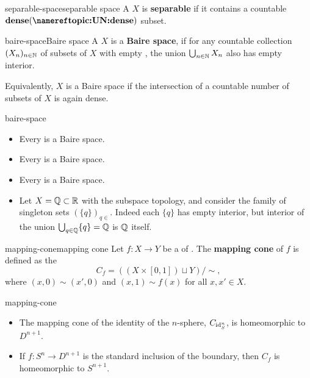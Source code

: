 \begin{topic}{separable-space}{separable space}
    A  $X$ is \textbf{separable} if it contains a countable $\tref{dense}{dense}$ subset.
\end{topic}

\begin{topic}{baire-space}{Baire space}
    A  $X$ is a \textbf{Baire space}, if for any countable collection $(X_n)_{n \in \mathbb{N}}$ of subsets of $X$ with empty , the union $\bigcup_{n \in \mathbb{N}} X_n$ also has empty interior.
    
    Equivalently, $X$ is a Baire space if the intersection of a countable number of  subsets of $X$ is again dense.
\end{topic}

\begin{example}{baire-space}
    \begin{itemize}
        \item Every   is a Baire space.
        \item Every  is a Baire space.
        \item Every  is a Baire space.
        \item Let $X = \mathbb{Q} \subset \mathbb{R}$ with the subspace topology, and consider the family of singleton sets $(\{ q \})_{q \in }$. Indeed each $\{ q \}$ has empty interior, but interior of the union $\bigcup_{q \in \mathbb{Q}} \{ q \} = \mathbb{Q}$ is $\mathbb{Q}$ itself.
    \end{itemize}
\end{example}

\begin{topic}{mapping-cone}{mapping cone}
    Let $f : X \to Y$ be a  of . The \textbf{mapping cone} of $f$ is defined as the 
    \[ C_f = ( (X \times [0, 1]) \sqcup Y ) / \sim{} , \]
    where $(x, 0) \sim (x', 0)$ and $(x, 1) \sim f(x)$ for all $x, x' \in X$.
\end{topic}

\begin{example}{mapping-cone}
    \begin{itemize}
        \item The mapping cone of the identity of the $n$-sphere, $C_{\text{id}_S^{n}}$, is homeomorphic to $D^{n + 1}$.
        \item If $f : S^n \to D^{n + 1}$ is the standard inclusion of the boundary, then $C_f$ is homeomorphic to $S^{n + 1}$.
    \end{itemize}
\end{example}

